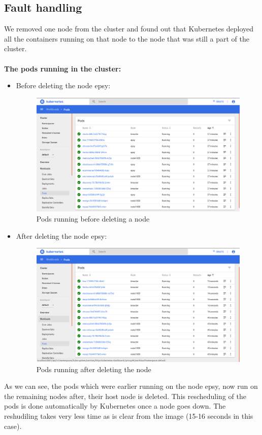 \documentclass[12pt]{article}
\begin{document}
\subsection{Fault handling}
We removed one node from the cluster and found out that Kubernetes deployed all the containers running on that node to the node that was still a part of the cluster.\\\\
\textbf{The pods running in the cluster:}
\begin{itemize}
	\item Before deleting the node epsy: 
		\begin{figure}[h!]
			\begin{center}
				\includegraphics[totalheight=0.32\textheight]{podswithepsy}
				\caption{Pods running before deleting a node}
			\end{center}
		\end{figure}
	\item After deleting the node epsy:
		\begin{figure}[h!]
			\begin{center}
				\includegraphics[totalheight=0.32\textheight]{podswithoutepsy}
				\caption{Pods running after deleting the node}
			\end{center}
		\end{figure}
\end{itemize}
As we can see, the pods which were earlier running on the node epsy, now run on the remaining nodes after, their host node is deleted. This rescheduling of the pods is done automatically by Kubernetes once a node goes down. The reshudiling takes very less time as is clear from the image (15-16 seconds in this case). 
\end{document}
